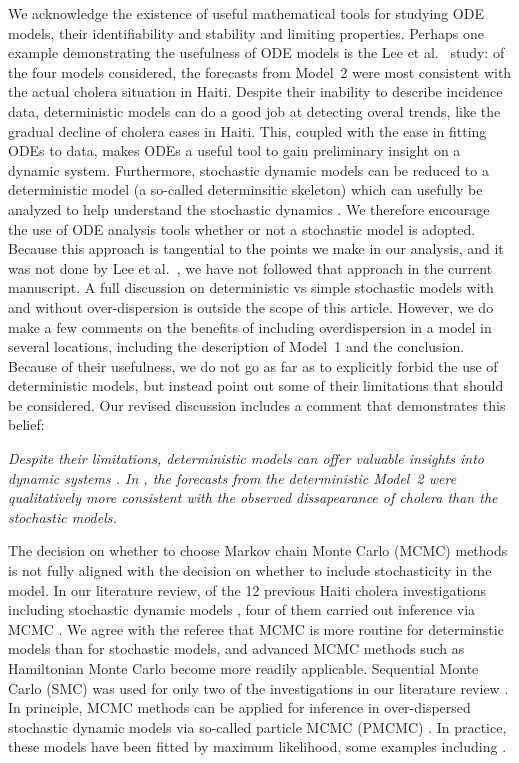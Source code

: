 \documentclass[11pt]{article}
\newcommand\article[1]{{\color{blue} \vspace{1mm}\hspace{0.25in}\parbox{6in}{\em #1}}}
\begin{document}
\article{\editDiscussionFour}

We acknowledge the existence of useful mathematical tools for studying ODE models, their identifiability and stability and limiting properties.
Perhaps one example demonstrating the usefulness of ODE models is the Lee et al.~\cite{lee20} study: of the four models considered, the forecasts from Model~2 were most consistent with the actual cholera situation in Haiti.
Despite their inability to describe incidence data, deterministic models can do a good job at detecting overal trends, like the gradual decline of cholera cases in Haiti.
This, coupled with the ease in fitting ODEs to data, makes ODEs a useful tool to gain preliminary insight on a dynamic system.
Furthermore, stochastic dynamic models can be reduced to a deterministic model (a so-called determinsitic skeleton) which can usefully be analyzed to help understand the stochastic dynamics \cite{coulson04}.
We therefore encourage the use of ODE analysis tools whether or not a stochastic model is adopted.
Because this approach is tangential to the points we make in our analysis, and it was not done by Lee et al.~\cite{lee20}, we have not followed that approach in the current manuscript.
A full discussion on deterministic vs simple stochastic models with and without over-dispersion is outside the scope of this article.
However, we do make a few comments on the benefits of including overdispersion in a model in several locations, including the description of Model~1 and the conclusion.
Because of their usefulness, we do not go as far as to explicitly forbid the use of deterministic models, but instead point out some of their limitations that should be considered.
Our revised discussion includes a comment that demonstrates this belief:

\article{Despite their limitations, deterministic models can offer valuable insights into dynamic systems \cite{may04}. In \cite{lee20}, the forecasts from the deterministic Model~2 were qualitatively more consistent with the observed dissapearance of cholera than the stochastic models.}

The decision on whether to choose Markov chain Monte Carlo (MCMC) methods is not fully aligned with the decision on whether to include stochasticity in the model.
In our literature review, of the 12 previous Haiti cholera investigations including stochastic dynamic models \cite{kirpich17,lee20,pasetto18,mukandavire13,kirpich16,lewnard16,kunkel17,mukandavire15,sallah17,azman12,azman15}, four of them carried out inference via MCMC \cite{pasetto18,lewnard16,sallah17,azman12}.
We agree with the referee that MCMC is more routine for determinstic models than for stochastic models, and advanced MCMC methods such as Hamiltonian Monte Carlo become more readily applicable.
Sequential Monte Carlo (SMC) was used for only two of the investigations in our literature review \cite{lee20,azman15}.
In principle, MCMC methods can be applied for inference in over-dispersed stochastic dynamic models via so-called particle MCMC (PMCMC) \cite{andrieu10}.
In practice, these models have been fitted by maximum likelihood, some examples including \cite{lemaitre19,fox22,molodecky23,pons-salort18,subramanian20,stocks20}.
\end{document}
